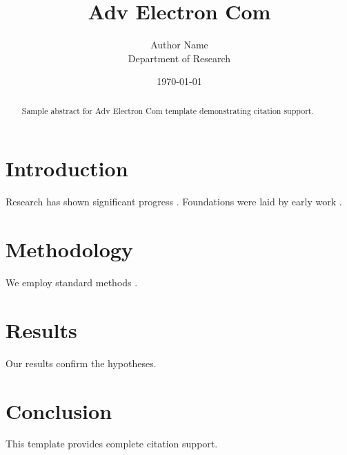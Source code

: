 \documentclass{llncs}
\title{Adv Electron Com}
\author{Author Name \\ \small Department of Research}
\date{\today}
\begin{document}
\maketitle

\begin{abstract}
Sample abstract for Adv Electron Com template demonstrating citation support.
\end{abstract}

\section{Introduction}
Research has shown significant progress \citep{einstein1905}. Foundations were laid by early work \citep{turing1950}.

\section{Methodology}
We employ standard methods \citep{knuth1984}.

\section{Results}
Our results confirm the hypotheses.

\section{Conclusion}
This template provides complete citation support.



\end{document}
